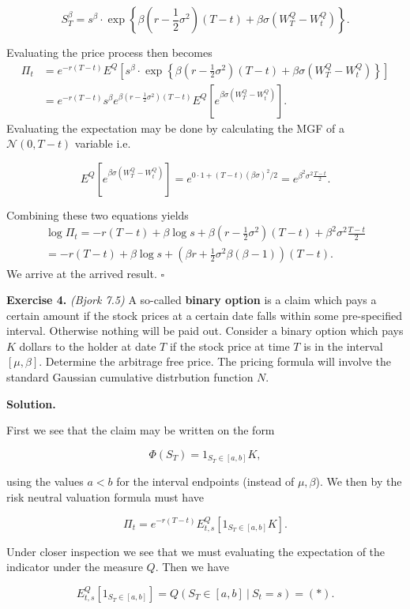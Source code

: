\documentclass[a4paper,12pt,openany]{book}
\begin{document}
\[
S_T^\beta=s^\beta\cdot\exp\left\{\beta\left(r-\frac{1}{2}\sigma^2\right)(T-t)+\beta\sigma  (W_T^Q-W_t^Q)\right\}.
\]

Evaluating the price process then becomes
\begin{align*}
\Pi_t&=e^{-r(T-t)}E^Q\left[s^\beta\cdot\exp\left\{\beta\left(r-\frac{1}{2}\sigma^2\right)(T-t)+\beta\sigma  (W_T^Q-W_t^Q)\right\}\right]\\
&=e^{-r(T-t)}s^\beta e^{\beta\left(r-\frac{1}{2}\sigma^2\right)(T-t)}E^Q\left[e^{\beta\sigma(W_T^Q-W_t^Q)}\right].
\end{align*}
Evaluating the expectation may be done by calculating the MGF of a \(\mathcal{N}(0,T-t)\) variable i.e.

\[
E^Q\left[e^{\beta\sigma(W_T^Q-W_t^Q)}\right]=e^{0\cdot 1+(T-t)(\beta\sigma)^2/2}=e^{\beta^2\sigma^2\frac{T-t}{2}}.
\]

Combining these two equations yields
\begin{align*}
\log \Pi_t=-r(T-t)+\beta\log s+\beta\left(r-\frac{1}{2}\sigma^2\right)(T-t)+\beta^2\sigma^2\frac{T-t}{2}\\
=-r(T-t)+\beta\log s+\left(\beta r+\frac{1}{2}\sigma^2\beta(\beta-1)\right)(T-t).
\end{align*}
We arrive at the arrived result. \(\square\)

\textbf{Exercise 4.} \emph{(Bjork 7.5)} A so-called \textbf{binary option} is a claim which pays a certain amount if the stock prices at a certain date falls within some pre-specified interval. Otherwise nothing will be paid out. Consider a binary option which pays \(K\) dollars to the holder at date \(T\) if the stock price at time \(T\) is in the interval \([\mu,\beta]\). Determine the arbitrage free price. The pricing formula will involve the standard Gaussian cumulative distrbution function \(N\).

\textbf{Solution.}

First we see that the claim may be written on the form

\[
\Phi(S_T)=1_{S_T\in [a,b]}K,
\]

using the values \(a<b\) for the interval endpoints (instead of \(\mu,\beta\)). We then by the risk neutral valuation formula must have

\[
\Pi_t=e^{-r(T-t)}E^Q_{t,s}[1_{S_T\in [a,b]}K].
\]

Under closer inspection we see that we must evaluating the expectation of the indicator under the measure \(Q\). Then we have

\[
E^Q_{t,s}[1_{S_T\in [a,b]}]=Q(S_T\in[a,b]\ \vert\ S_t=s)=(*).
\]
\end{document}
